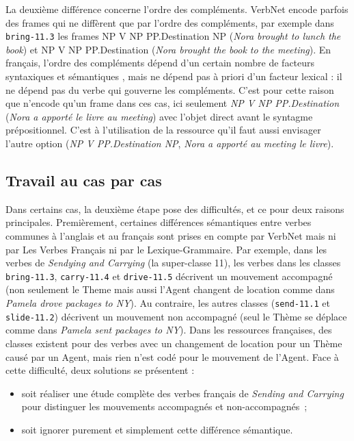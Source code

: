 La deuxième différence concerne l'ordre des compléments. VerbNet encode parfois
des frames qui ne diffèrent que par l'ordre des compléments, par exemple dans
{\color{blue}\texttt{bring-11.3}} les frames NP V NP PP.Destination NP
(\textit{Nora brought to lunch the book}) et NP V NP PP.Destination
(\textit{Nora brought the book to the meeting}). En français, l'ordre des
compléments dépend d'un certain nombre de facteurs syntaxiques et sémantiques
\citep{thuilier2012contraintes}, mais ne dépend pas à priori d'un facteur
lexical : il ne dépend pas du verbe qui gouverne les compléments. C'est pour
cette raison que \verbenet{} n'encode qu'un frame dans ces cas, ici seulement
\textit{NP V NP PP.Destination} (\textit{Nora a apporté le livre au meeting})
avec l'objet direct avant le syntagme prépositionnel. C'est à l'utilisation de
la ressource qu'il faut aussi envisager l'autre option (\textit{NP V
PP.Destination NP}, \textit{Nora a apporté au meeting le livre}).

\subsection{Travail au cas par cas}\label{casebycase}

Dans certains cas, la deuxième étape pose des difficultés, et ce pour deux
raisons principales. Premièrement, certaines différences sémantiques entre
verbes communes à l'anglais et au français sont prises en compte par VerbNet
mais ni par Les Verbes Français ni par le Lexique-Grammaire. Par exemple, dans
les verbes de \textit{Sendying and Carrying} (la super-classe 11), les verbes
dans les classes {\color{blue}\texttt{bring-11.3}},
{\color{blue}\texttt{carry-11.4}} et {\color{blue}\texttt{drive-11.5}}
décrivent un mouvement accompagné (non seulement le Theme mais aussi l'Agent
changent de location comme dans \textit{Pamela drove packages to NY}). Au
contraire, les autres classes ({\color{blue}\texttt{send-11.1}} et
{\color{blue}\texttt{slide-11.2}}) décrivent un mouvement non accompagné (seul
le Thème se déplace comme dans \textit{Pamela sent packages to NY}). Dans les
ressources françaises, des classes existent pour des verbes avec un changement
de location pour un Thème causé par un Agent, mais rien n'est codé pour le
mouvement de l'Agent. Face à cette difficulté, deux solutions se présentent :

\begin{itemize}
    \item soit réaliser une étude complète des verbes français de \textit{Sending
        and Carrying} pour distinguer les mouvements accompagnés et
        non-accompagnés~;
    \item soit ignorer purement et simplement cette différence sémantique.
\end{itemize}

